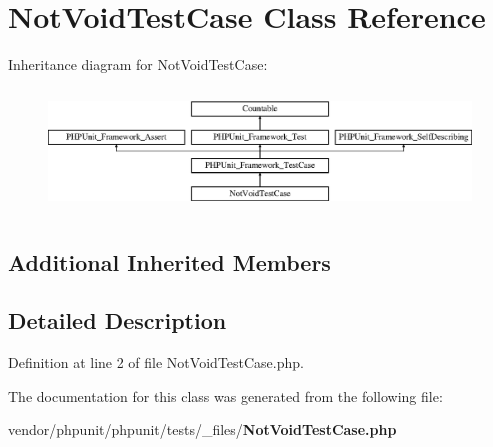 \section{Not\+Void\+Test\+Case Class Reference}
\label{class_not_void_test_case}
Inheritance diagram for Not\+Void\+Test\+Case\+:\begin{figure}[H]
\begin{center}
\leavevmode
\includegraphics[height=3.303835cm]{class_not_void_test_case}
\end{center}
\end{figure}
\subsection*{Additional Inherited Members}


\subsection{Detailed Description}


Definition at line 2 of file Not\+Void\+Test\+Case.\+php.



The documentation for this class was generated from the following file\+:\begin{DoxyCompactItemize}
\item 
vendor/phpunit/phpunit/tests/\+\_\+files/{\bf Not\+Void\+Test\+Case.\+php}\end{DoxyCompactItemize}
